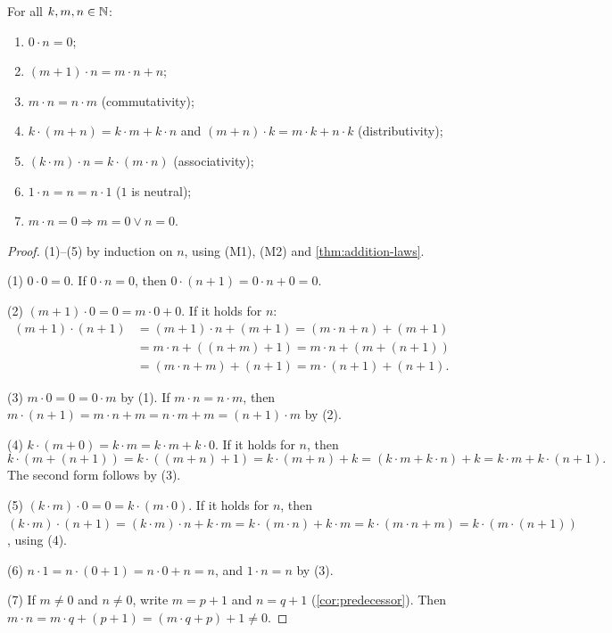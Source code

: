 \begin{theorem}
\label{thm:multiplication-laws}
For all $k, m, n \in \mathbb{N}$:
\begin{enumerate}
  \item $0 \cdot n = 0$;
  \item $(m + 1) \cdot n = m \cdot n + n$;
  \item $m \cdot n = n \cdot m$ (commutativity);
  \item $k \cdot (m + n) = k \cdot m + k \cdot n$ and $(m + n) \cdot k = m \cdot k
    + n \cdot k$ (distributivity);
  \item $(k \cdot m) \cdot n = k \cdot (m \cdot n)$ (associativity);
  \item $1 \cdot n = n = n \cdot 1$ ($1$ is neutral);
  \item $m \cdot n = 0 \Rightarrow m = 0 \lor n = 0$.
\end{enumerate}
\end{theorem}

\begin{proof}
(1)--(5) by induction on $n$, using (M1), (M2) and \cref{thm:addition-laws}.

(1) $0 \cdot 0 = 0$. If $0 \cdot n = 0$, then $0 \cdot (n + 1) = 0 \cdot n + 0 =
0$.

(2) $(m + 1) \cdot 0 = 0 = m \cdot 0 + 0$. If it holds for $n$:
\begin{align*}
  (m + 1) \cdot (n + 1) &= (m + 1) \cdot n + (m + 1) = (m \cdot n + n) + (m + 1) \\
  &= m \cdot n + ((n + m) + 1) = m \cdot n + (m + (n + 1)) \\
  &= (m \cdot n + m) + (n + 1) = m \cdot (n + 1) + (n + 1).
\end{align*}

(3) $m \cdot 0 = 0 = 0 \cdot m$ by (1). If $m \cdot n = n \cdot m$, then $m \cdot
(n + 1) = m \cdot n + m = n \cdot m + m = (n + 1) \cdot m$ by (2).

(4) $k \cdot (m + 0) = k \cdot m = k \cdot m + k \cdot 0$. If it holds for $n$,
then
\[
  k \cdot (m + (n + 1)) = k \cdot ((m + n) + 1) = k \cdot (m + n) + k = (k \cdot m
  + k \cdot n) + k = k \cdot m + k \cdot (n + 1).
\]
The second form follows by (3).

(5) $(k \cdot m) \cdot 0 = 0 = k \cdot (m \cdot 0)$. If it holds for $n$, then
$(k \cdot m) \cdot (n + 1) = (k \cdot m) \cdot n + k \cdot m = k \cdot (m \cdot n)
+ k \cdot m = k \cdot (m \cdot n + m) = k \cdot (m \cdot (n + 1))$, using (4).

(6) $n \cdot 1 = n \cdot (0 + 1) = n \cdot 0 + n = n$, and $1 \cdot n = n$ by (3).

(7) If $m \neq 0$ and $n \neq 0$, write $m = p + 1$ and $n = q + 1$
(\cref{cor:predecessor}). Then $m \cdot n = m \cdot q + (p + 1) = (m \cdot q + p) +
1 \neq 0$.
\end{proof}

